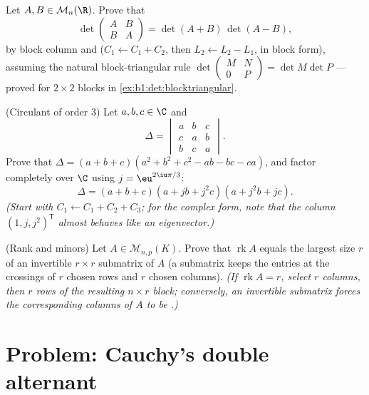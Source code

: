 \begin{exercise}[$\star\star\star$]\label{exo:b1:det:10}
Let $A, B \in \mathcal{M}_n(\R)$. Prove that
\[
\det\begin{pmatrix} A & B\\ B & A \end{pmatrix}
= \det(A + B)\,\det(A - B),
\]
by block column and  ($C_1 \leftarrow C_1 + C_2$, then
$L_2 \leftarrow L_2 - L_1$, in block form), assuming the natural
block-triangular rule $\det\begin{pmatrix} M & N\\ 0 &
P\end{pmatrix} = \det M \det P$ --- proved for $2 \times 2$
blocks in \cref{ex:b1:det:blocktriangular}.
\end{exercise}

\begin{exercise}[$\star\star$]\label{exo:b1:det:11}
(Circulant of order $3$) Let $a, b, c \in \C$ and
\[
\Delta = \begin{vmatrix}
a & b & c\\
c & a & b\\
b & c & a
\end{vmatrix}.
\]
Prove that $\Delta = (a + b + c)(a^2 + b^2 + c^2 - ab - bc -
ca)$, and factor completely over $\C$ using $j =
\eu^{2\iu\pi/3}$:
\[
\Delta = (a + b + c)(a + jb + j^2c)(a + j^2b + jc) .
\]
\emph{(Start with $C_1 \leftarrow C_1 + C_2 + C_3$; for the
complex form, note that the column $(1, j, j^2)^{\mathsf T}$
almost behaves like an eigenvector.)}
\end{exercise}

\begin{exercise}[$\star\star\star$]\label{exo:b1:det:12}
(Rank and minors) Let $A \in \mathcal{M}_{n,p}(K)$. Prove that
$\operatorname{rk} A$ equals the largest size $r$ of an
invertible $r \times r$ submatrix of $A$ (a submatrix keeps the
entries at the crossings of $r$ chosen rows and $r$ chosen
columns). \emph{(If $\operatorname{rk} A = r$, select $r$ 
columns, then $r$  rows of the resulting $n \times r$ block;
conversely, an invertible submatrix forces the corresponding
columns of $A$ to be .)}
\end{exercise}

\section{Problem: Cauchy's double alternant}

